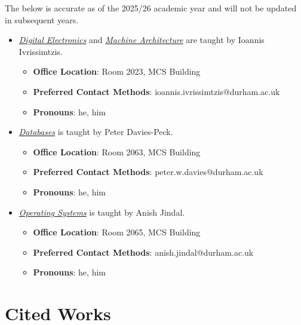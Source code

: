 \documentclass{article}
\begin{document}
The below is accurate as of the 2025/26 academic year and will not be updated in subsequent years.
\begin{itemize}
    \item \hyperref[part:1.de]{\textit{Digital Electronics}} and \hyperref[part:2.ma]{\textit{Machine Architecture}} are taught by Ioannis Ivrissimtzis.
    \begin{itemize}
        \item \textbf{Office Location}: Room 2023, MCS Building
        \item \textbf{Preferred Contact Methods}: ioannis.ivrissimtzis@durham.ac.uk
        \item \textbf{Pronouns}: he, him
    \end{itemize}
    
    \item \hyperref[part:3.db]{\textit{Databases}} is taught by Peter Davies-Peck.
    \begin{itemize}
        \item \textbf{Office Location}: Room 2063, MCS Building
        \item \textbf{Preferred Contact Methods}: peter.w.davies@durham.ac.uk
        \item \textbf{Pronouns}: he, him
    \end{itemize}
    
    \item \hyperref[part:4.os]{\textit{Operating Systems}} is taught by Anish Jindal.
    \begin{itemize}
        \item \textbf{Office Location}: Room 2065, MCS Building
        \item \textbf{Preferred Contact Methods}: anish.jindal@durham.ac.uk
        \item \textbf{Pronouns}: he, him
    \end{itemize}
\end{itemize}

\section{Cited Works}
\end{document}
